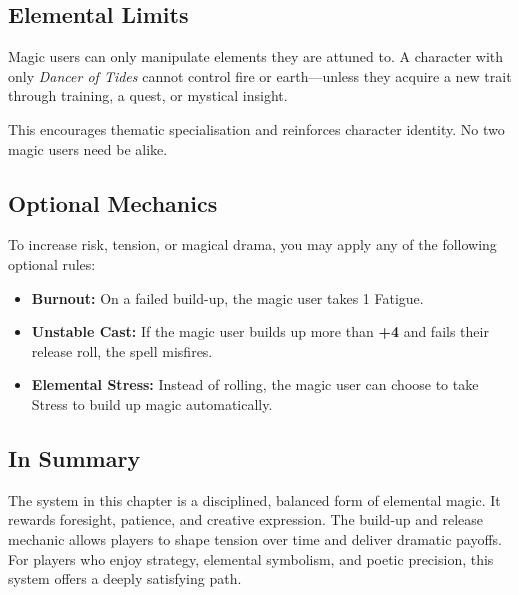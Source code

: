\subsection{Elemental Limits}

Magic users can only manipulate elements they are attuned to. A character with only \textit{Dancer of Tides} cannot control fire or earth—unless they acquire a new trait through training, a quest, or mystical insight.

This encourages thematic specialisation and reinforces character identity. No two magic users need be alike.

\subsection{Optional Mechanics}

To increase risk, tension, or magical drama, you may apply any of the following optional rules:

\begin{itemize}
    \item \textbf{Burnout:} On a failed build-up, the magic user takes 1 Fatigue.
    \item \textbf{Unstable Cast:} If the magic user builds up more than \textbf{+4} and fails their release roll, the spell misfires.
    \item \textbf{Elemental Stress:} Instead of rolling, the magic user can choose to take Stress to build up magic automatically.
\end{itemize}

\subsection{In Summary}

The system in this chapter is a disciplined, balanced form of elemental magic. It rewards foresight, patience, and creative expression. The build-up and release mechanic allows players to shape tension over time and deliver dramatic payoffs. For players who enjoy strategy, elemental symbolism, and poetic precision, this system offers a deeply satisfying path.